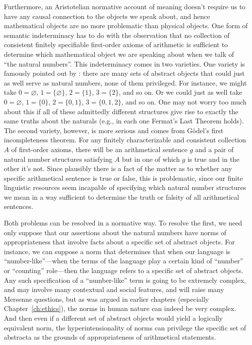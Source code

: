 Furthermore, an Aristotelian normative account of meaning doesn't require us to have any causal connection to the objects we speak about, and hence mathematical objects
are no more problematic than physical objects. One form of semantic indeterminacy has to do with the observation that no collection of consistent finitely specifiable first-order axioms of arithmetic is sufficient 
to determine which mathematical object we are speaking about when we talk of ``the natural numbers''. This indeterminacy
comes in two varieties. One variety is famously pointed out by : there are many sets of abstract objects
that could just as well serve as natural numbers, none of them privileged. For instance, we might take $0=\varnothing$,
$1=\{ \varnothing \}$, $2=\{ 1 \}$, $3=\{ 2\}$, and so on. Or we could just as well take $0=\varnothing$, $1=\{ 0 \}$,
$2=\{ 0,1 \}$, $3=\{0,1,2\}$, and so on. One may not worry too much about this if all of these admittedly different
structures give rise to exactly the same truths about the naturals (e.g., in each one Fermat's Last Theorem holds).
The second variety, however, is more serious and comes from G\"odel's first incompleteness theorem. 
For any finitely characterizable and consistent collection $A$ of first-order axioms, there will be an arithmetical
sentence $g$ and a pair of natural number structures satisfying $A$ but in one of which $g$ is true and in the
other it's not. Since plausibly there is a fact of the matter as to whether any specific arithmetical sentence
is true or false, this is problematic, since our finite linguistic resources seem incapable of specifying which
natural number structures we mean in a way sufficient to determine the truth or falsity of all arithmetical sentences.

Both problems can be resolved in a normative way. To resolve the first, we need only suppose that our assertions
about the natural numbers have norms of appropriateness that involve facts about a specific set of abstract objects.
For instance, we can suppose a norm that determines that 
when our language is ``number-like''---when the terms of the language play a certain kind of ``number'' or ``counting'' role---then
the language refers to a specific set of abstract objects. Any such specification of a ``number-like'' term is going
to be extremely complex, and may involve many contextual and social features, and will raise many Mersenne questions,
but as was argued in earlier chapters (especially Chapter~\ref{ch:ethics}), the norms in human nature can indeed be very complex. 
And then even if a different set of abstract objects would yield a logically equivalent norm, the hyperintensionality of
norms can privilege the specific set of abstracta as the grounds of appropriateness of arithmetical statements.

